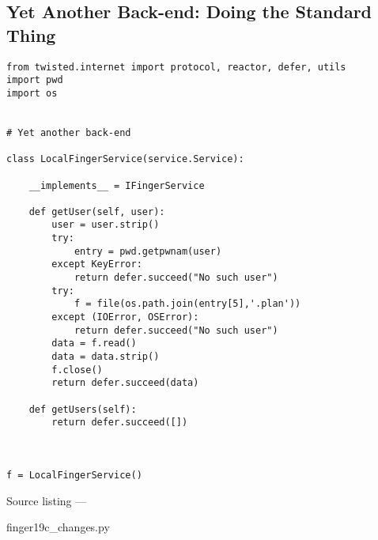 \subsection{Yet Another Back-end: Doing the Standard Thing}
\begin{verbatim}
from twisted.internet import protocol, reactor, defer, utils
import pwd
import os


# Yet another back-end

class LocalFingerService(service.Service):

    __implements__ = IFingerService

    def getUser(self, user):
        user = user.strip()
        try:
            entry = pwd.getpwnam(user)
        except KeyError:
            return defer.succeed("No such user")
        try:
            f = file(os.path.join(entry[5],'.plan'))
        except (IOError, OSError):
            return defer.succeed("No such user")
        data = f.read()
        data = data.strip()
        f.close()
        return defer.succeed(data)

    def getUsers(self):
        return defer.succeed([])



f = LocalFingerService()
\end{verbatim}\parbox[b]{\linewidth}{\begin{center}Source listing --- \begin{em}finger19c\_changes.py\end{em}\end{center}}

